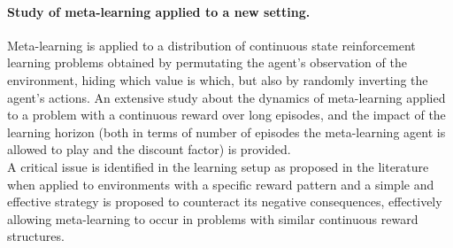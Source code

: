 \paragraph{Study of meta-learning applied to a new setting.} Meta-learning is applied
to a distribution of continuous state reinforcement learning problems
obtained by permutating the agent's observation of the environment, hiding
which value is which, but also by randomly inverting the agent's actions. 
An extensive
study about the dynamics of meta-learning applied to a problem with a continuous
reward over long episodes, and the impact of the learning horizon (both
in terms of number of episodes the meta-learning agent is allowed to play
and the discount factor) is provided. \\

A critical issue is identified in the learning setup as proposed in the
literature when applied to environments with a specific reward pattern
and a simple and effective strategy is proposed to counteract its
negative consequences, effectively allowing meta-learning to occur in
problems with similar continuous reward structures.

